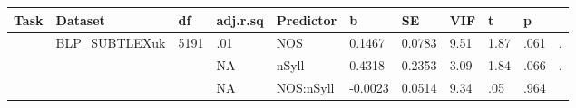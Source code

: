 \begin{table}[ht]
\centering
\begingroup\normalsize
\begin{tabular}{lllllllllll}
  \hline
Task & Dataset & df & adj.r.sq & Predictor & b & SE & VIF & t & p &  \\ 
  \hline
 & BLP\_SUBTLEXuk & 5191 & .01 & NOS & 0.1467 & 0.0783 & 9.51 & 1.87 & .061 & . \\ 
   &  &  & NA & nSyll & 0.4318 & 0.2353 & 3.09 & 1.84 & .066 & . \\ 
   &  &  & NA & NOS:nSyll & -0.0023 & 0.0514 & 9.34 & .05 & .964 &   \\ 
   \hline
\end{tabular}
\endgroup
\end{table}
